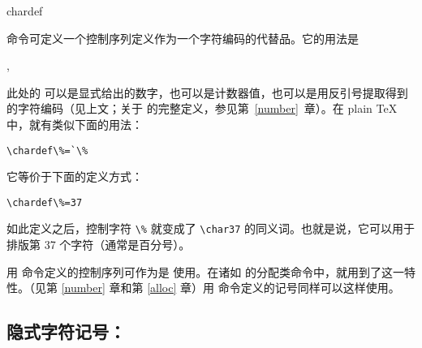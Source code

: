 \documentclass{book}
\begin{document}
\csterm chardef\par 命令可定义一个控制序列定义作为一个字符编码的代替品。\label{chardef}它的用法是
\begin{disp}
,
\end{disp}
此处的  可以是显式给出的数字，也可以是计数器值，也可以是用反引号提取得到的字符编码（见上文；关于  的完整定义，参见第~\ref{number}~章）。在 plain TeX 中，就有类似下面的用法：
\begin{verbatim}
\chardef\%=`\%
\end{verbatim}
它等价于下面的定义方式：
\begin{verbatim}
\chardef\%=37
\end{verbatim}
如此定义之后，控制字符 \verb.\%. 就变成了 \verb.\char37. 的同义词。也就是说，它可以用于排版第 37 个字符（通常是百分号）。

用  命令定义的控制序列可作为是  使用。在诸如  的分配类命令中，就用到了这一特性。（见第 \ref{number} 章和第 \ref{alloc} 章）用  命令定义的记号同样可以这样使用。

\subsection{隐式字符记号：\protect{}}
\end{document}
